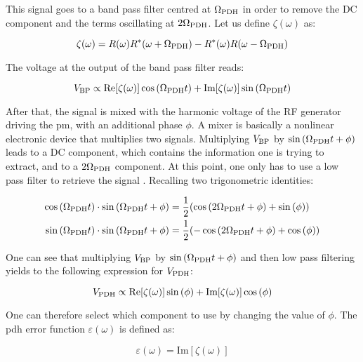 This signal goes to a band pass filter centred at $\Omega_{\text{PDH}}$ in order to remove the DC component and the terms oscillating at $2\Omega_{\text{PDH}}$. Let us define $\zeta(\omega)$ as:

\begin{equation}
	\zeta(\omega) = R(\omega)R^*(\omega+\Omega_{\text{PDH}})-R^*(\omega)R(\omega-\Omega_{\text{PDH}})
\end{equation}

The voltage at the output of the band pass filter reads:

\begin{equation}
	V_{\text{BP}} \propto \text{Re}[\zeta(\omega)]\cos{(\Omega_{\text{PDH}}t)} + \text{Im}[\zeta(\omega)] \sin{(\Omega_{\text{PDH}}t)}
\end{equation}

After that, the signal is mixed with the harmonic voltage of the RF generator driving the \gls{pm}, with an additional phase $\phi$. A mixer is basically a nonlinear electronic device that multiplies two signals. Multiplying $V_{\text{BP}}$ by $\sin{(\Omega_{\text{PDH}}t+\phi)}$ leads to a DC component, which contains the information one is trying to extract, and to a $2\Omega_{\text{PDH}}$ component. At this point, one only has to use a low pass filter to retrieve the signal \cite{nickersonreview}. Recalling two trigonometric identities:

\begin{align}
	\cos{(\Omega_{\text{PDH}}t)}\cdot \sin{(\Omega_{\text{PDH}}t+\phi)} &= \frac{1}{2} (\cos{(2\Omega_{\text{PDH}}t+\phi)}+\sin{(\phi)})  \\
	\sin{(\Omega_{\text{PDH}}t)}\cdot \sin{(\Omega_{\text{PDH}}t+\phi)} &= \frac{1}{2} (-\cos{(2\Omega_{\text{PDH}}t+\phi)}+\cos{(\phi)}) 
\end{align}

One can see that multiplying $V_{\text{BP}}$ by $\sin{(\Omega_{\text{PDH}}t+\phi)}$ and then low pass filtering yields to the following expression for $V_{\text{PDH}}$:

\begin{equation}
	V_{\text{PDH}} \propto \text{Re}[\zeta(\omega)]\sin{(\phi)} + \text{Im}[\zeta(\omega)]\cos{(\phi)}
\end{equation}

One can therefore select which component to use by changing the value of $\phi$. The \gls{pdh} error function $\varepsilon(\omega)$ is defined as:

\begin{equation}
	\varepsilon(\omega) = \text{Im}[\zeta(\omega)]
\end{equation}

